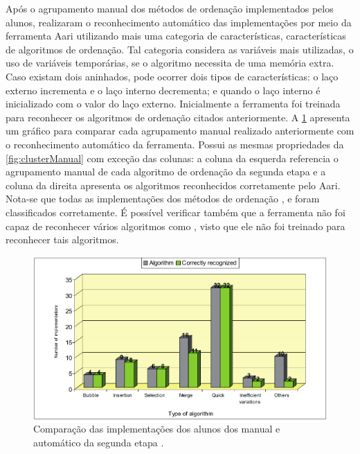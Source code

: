 		Após o agrupamento manual dos métodos de ordenação implementados pelos alunos,
		 realizaram o reconhecimento automático das
		implementações por meio da ferramenta Aari utilizando mais uma categoria de
		características, características de algoritmos de ordenação. Tal categoria
		considera as variáveis mais utilizadas, o uso de variáveis temporárias, se o
		algoritmo necessita de uma memória extra. Caso existam dois 
		aninhados, pode ocorrer dois tipos de características: o laço externo incrementa
		e o laço interno decrementa; e quando o laço interno é inicializado com o valor
		do laço externo. Inicialmente a ferramenta foi treinada para reconhecer os
		algoritmos de ordenação citados anteriormente. A \cref{fig:clusterAutomatico}
		apresenta um gráfico para comparar cada agrupamento manual realizado anteriormente
		com o reconhecimento automático da ferramenta. Possui as mesmas propriedades da
		\cref{fig:clusterManual} com exceção das colunas: a coluna da esquerda referencia
		o agrupamento manual de cada algoritmo de ordenação da segunda etapa e a coluna
		da direita apresenta os algoritmos reconhecidos corretamente pelo Aari. Nota-se
		que todas as implementações dos métodos de ordenação ,
		 e  foram classificados corretamente.
		É possível verificar também que a ferramenta não foi capaz de reconhecer vários
		algoritmos como , visto que ele não foi treinado para
		reconhecer tais algoritmos.
		
		\begin{figure}[ht]
			\centering
			\includegraphics[scale=0.33]{imagem/clusterAutomatico.png}
			\caption[Comparação das implementações dos alunos dos 
			manual e automático da segunda etapa]{Comparação das implementações dos alunos dos 
			manual e automático da segunda etapa \cite{Taherkhani:2012}.}
			\label{fig:clusterAutomatico}
		\end{figure}
		
